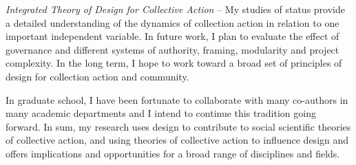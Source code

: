 \documentclass[10pt]{memoir}
\begin{document}
\emph{Integrated Theory of Design for Collective Action} --
My studies of status provide a detailed understanding of the dynamics
of collection action in relation to one important independent
variable. In future work, I plan to evaluate the effect of governance
and different systems of authority, framing, modularity and project
complexity. In the long term, I hope to work toward a broad set of
principles of design for collection action and community.

In graduate school, I have been fortunate to collaborate with many
co-authors in many academic departments and I intend to continue this
tradition going forward. In sum, my research uses design to contribute
to social scientific theories of collective action, and using theories
of collective action to influence design and offers implications and
opportunities for a broad range of disciplines and fields.

\renewcommand{\bibsection}{\section{\bibname}\prebibhook}
\baselineskip 14.2pt


\end{document}
